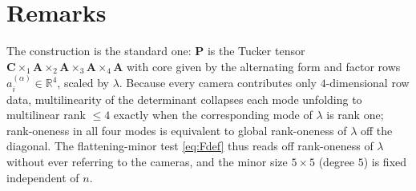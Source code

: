 \documentclass[12pt]{article}
\newcommand{\bR}{\mathbb{R}}
\theoremstyle{definition}
\begin{document}
\section*{Remarks}

The construction is the standard one: $\mathbf P$ is the Tucker tensor
$\mathbf C\times_1\mathbf A\times_2\mathbf A\times_3\mathbf A\times_4\mathbf A$ with
core given by the alternating form and factor rows $a^{(\alpha)}_i\in\bR^4$, scaled by
$\lambda$.  Because every camera contributes only $4$-dimensional row data,
multilinearity of the determinant collapses each mode unfolding to multilinear rank
$\le 4$ exactly when the corresponding mode of $\lambda$ is rank one; rank-oneness in
all four modes is equivalent to global rank-oneness of $\lambda$ off the diagonal.
The flattening-minor test \eqref{eq:Fdef} thus reads off rank-oneness of $\lambda$
without ever referring to the cameras, and the minor size $5\times5$ (degree $5$) is
fixed independent of $n$.
\end{document}
